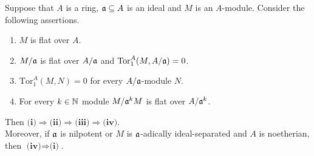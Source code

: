 \begin{theorem}\label{theorem:infinitesimalflatness}
Suppose that $A$ is a ring, $\mathfrak{a}\subseteq A$ is an ideal and $M$ is an $A$-module. Consider the following assertions.
\begin{enumerate}[label=\emph{\textbf{(\roman*)}}, leftmargin=*]
\item $M$ is flat over $A$.
\item $M/\mathfrak{a}$ is flat over $A/\mathfrak{a}$ and $\mathrm{Tor}^A_1(M,A/\mathfrak{a})=0$.
\item $\mathrm{Tor}^A_1(M,N)=0$ for every $A/\mathfrak{a}$-module $N$.
\item For every $k\in {\mathbb N}$ module $M/\mathfrak{a}^kM$ is flat over $A/\mathfrak{a}^k$.
\end{enumerate}
Then \emph{$\textbf{(i)}\Rightarrow \textbf{(ii)}\Rightarrow \textbf{(iii)}\Rightarrow \textbf{(iv)}$}.\\
Moreover, if $\mathfrak{a}$ is nilpotent or $M$ is $\mathfrak{a}$-adically ideal-separated and $A$ is noetherian, then \emph{$\textbf{(iv)}\Rightarrow \textbf{(i)}$}. 
\end{theorem}
